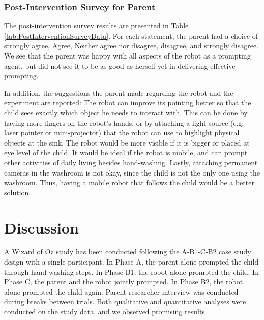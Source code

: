 \documentclass{ut-thesis}
\begin{document}
\subsubsection{Post-Intervention Survey for Parent}
The post-intervention survey results are presented in Table \ref{tab:PostInterventionSurveyData}.  For each statement, the parent had a choice of strongly agree, Agree, Neither agree nor disagree, disagree, and strongly disagree.  We see that the parent was happy with all aspects of the robot as a prompting agent, but did not see it to be as good as herself yet in delivering effective prompting.

In addition, the suggestions the parent made regarding the robot and the experiment are reported:  The robot can improve its pointing better so that the child sees exactly which object he needs to interact with.  This can be done by having more fingers on the robot's hands, or by attaching a light source (e.g. laser pointer or mini-projector) that the robot can use to highlight physical objects at the sink.  The robot would be more visible if it is bigger or placed at eye level of the child.  It would be ideal if the robot is mobile, and can prompt other activities of daily living besides hand-washing.  Lastly, attaching permanent cameras in the washroom is not okay, since the child is not the only one using the washroom.  Thus, having a mobile robot that follows the child would be a better solution.





\section{Discussion}
A Wizard of Oz study has been conducted following the A-B1-C-B2 case study design with a single participant.  In Phase A, the parent alone prompted the child through hand-washing steps.  In Phase B1, the robot alone prompted the child.  In Phase C, the parent and the robot jointly prompted.  In Phase B2, the robot alone prompted the child again.  Parent researcher interview was conducted during breaks between trials.  Both qualitative and quantitative analyses were conducted on the study data, and we observed promising results.
\end{document}
